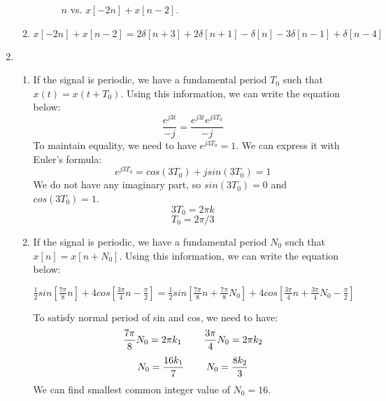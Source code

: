 \documentclass[10pt,a4paper, margin=1in]{article}
\begin{document}
\begin{enumerate}
\begin{enumerate}
     \begin{figure}[H]
     \centering
     \caption{$n$ vs. $x[-2n]+x[n-2]$.}
     \label{fig:fig3}
     \end{figure}
     

    \item %
    $x[-2n]+x[n-2] = 2\delta[n+3]+2\delta[n+1]-\delta[n]-3\delta[n-1]+\delta[n-4]$
    \end{enumerate}

\item %
    \begin{enumerate}   
    \item If the signal is periodic, we have a fundamental period $T_0$ such that $x(t) = x(t + T_0)$. Using this information, we can write the equation below:
    \[\frac{e^{j3t}}{-j} = \frac{e^{j3t}e^{j3T_0}}{-j}\]
    To maintain equality, we need to have $e^{j3T_0} = 1$. We can express it with Euler's formula:
    \[e^{j3T_0} = cos(3T_0) + jsin(3T_0) =  1\]
    We do not have any imaginary part, so $sin(3T_0) = 0$ and  $cos(3T_0) = 1$. 
    \[3T_0 = 2\pi k\]
    \[T_0 = 2\pi /3\]
    \item If the signal is periodic, we have a fundamental period $N_0$ such that $x[n] = x[n + N_0]$. Using this information, we can write the equation below:
    \begin{center}
        \begin{math}
            \frac{1}{2}sin[\frac{7\pi}{8}n] + 4cos[\frac{3\pi}{4}n - \frac{\pi}{2}] = \frac{1}{2}sin[\frac{7\pi}{8}n + \frac{7\pi}{8}N_0] + 4cos[\frac{3\pi}{4}n + \frac{3\pi}{4}N_0 - \frac{\pi}{2}]
        \end{math}
    \end{center}
    To satisfy normal period of sin and cos, we need to have:
    \[\frac{7\pi}{8}N_0 = 2\pi k_1 \hspace{8mm} \frac{3\pi}{4}N_0 = 2\pi k_2\]
    \[N_0 = \frac{16k_1}{7} \hspace{8mm} N_0 = \frac{8k_2}{3}\]
    We can find smallest common integer value of $N_0 = 16$.
    \end{enumerate}


\end{enumerate}
\end{document}
